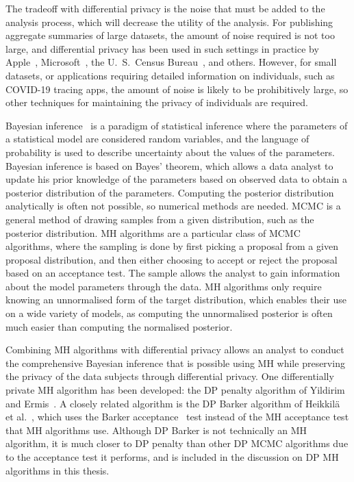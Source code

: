 \documentclass[english,twoside,openright]{HYgraduMLDS}
\begin{document}
The tradeoff with differential privacy is the noise that must be added to the
analysis process, which will decrease the utility of the analysis. For publishing
aggregate summaries of large datasets, the amount of noise required is not too
large, and differential privacy has been used in such settings in practice by
Apple~\cite{App17}, Microsoft~\cite{DKY17}, the U.\ S.\ Census Bureau~\cite{Abo18},
and others. However, for small datasets, or applications requiring detailed
information on individuals, such as COVID-19 tracing apps, the amount of
noise is likely to be prohibitively large, so other techniques for maintaining
the privacy of individuals are required.

Bayesian inference~\cite{BDA} is a paradigm of statistical inference where
the parameters of a statistical model are considered random variables, and
the language of probability is used to describe uncertainty about the values of the
parameters. Bayesian inference is based on Bayes' theorem, which allows
a data analyst to update his prior knowledge of the parameters based on observed
data to obtain a posterior distribution of the parameters.
Computing the posterior distribution analytically is often not possible,
so numerical methods are needed. MCMC is a general
method of drawing samples from a given distribution, such as the
posterior distribution. MH algorithms are a particular class
of MCMC algorithms, where
the sampling is done by first picking a proposal from a given proposal distribution,
and then either choosing to accept or reject the proposal based on an acceptance
test. The sample allows
the analyst to gain information about the model parameters through the data.
MH algorithms only require knowing an unnormalised form of the target distribution,
which enables their use on a wide variety of models, as computing the unnormalised
posterior is often much easier than computing the normalised posterior.

Combining MH algorithms with differential privacy allows
an analyst to conduct the comprehensive Bayesian inference that is
possible using MH while preserving the privacy of the data subjects through
differential privacy. One differentially private MH algorithm has been
developed: the DP penalty algorithm of Yildirim and Ermis~\cite{YildirimE19}.
A closely related algorithm is the DP Barker algorithm of
Heikkilä et al.~\cite{HeikkilaJDH19}, which uses the Barker
acceptance~\cite{Barker65} test instead of the MH acceptance test
that MH algorithms use. Although DP Barker is not technically an MH algorithm,
it is much closer to DP penalty than other DP MCMC algorithms due to the
acceptance test it performs, and is included in the discussion on DP MH
algorithms in this thesis.
\end{document}
